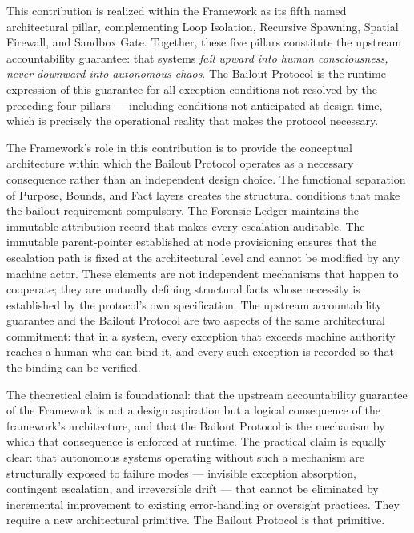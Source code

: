 This contribution is realized within the \bxthree{} Framework as its fifth named architectural pillar, complementing Loop Isolation, Recursive Spawning, Spatial Firewall, and Sandbox Gate. Together, these five pillars constitute the upstream accountability guarantee: that \bxthree{} systems \emph{fail upward into human consciousness, never downward into autonomous chaos}. The Bailout Protocol is the runtime expression of this guarantee for all exception conditions not resolved by the preceding four pillars — including conditions not anticipated at design time, which is precisely the operational reality that makes the protocol necessary.

The \bxthree{} Framework's role in this contribution is to provide the conceptual architecture within which the Bailout Protocol operates as a necessary consequence rather than an independent design choice. The functional separation of Purpose, Bounds, and Fact layers creates the structural conditions that make the bailout requirement compulsory. The Forensic Ledger maintains the immutable attribution record that makes every escalation auditable. The immutable parent-pointer established at node provisioning ensures that the escalation path is fixed at the architectural level and cannot be modified by any machine actor. These elements are not independent mechanisms that happen to cooperate; they are mutually defining structural facts whose necessity is established by the protocol's own specification. The upstream accountability guarantee and the Bailout Protocol are two aspects of the same architectural commitment: that in a \bxthree{} system, every exception that exceeds machine authority reaches a human who can bind it, and every such exception is recorded so that the binding can be verified.

The theoretical claim is foundational: that the upstream accountability guarantee of the \bxthree{} Framework is not a design aspiration but a logical consequence of the framework's architecture, and that the Bailout Protocol is the mechanism by which that consequence is enforced at runtime. The practical claim is equally clear: that autonomous systems operating without such a mechanism are structurally exposed to failure modes — invisible exception absorption, contingent escalation, and irreversible drift — that cannot be eliminated by incremental improvement to existing error-handling or oversight practices. They require a new architectural primitive. The Bailout Protocol is that primitive.

